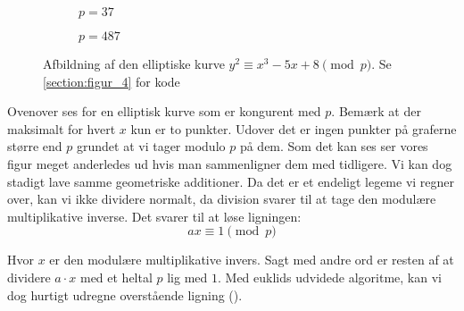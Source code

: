 \begin{figure}[htbp]
\centering
\begin{subfigure}{.5\textwidth}
  \centering
  
  \caption{$p=37$}
  \label{fig:sub1}
\end{subfigure}%
\begin{subfigure}{.5\textwidth}
  \centering
  
  \caption{$p=487$}
  \label{fig:sub2}
\end{subfigure}
\caption{Afbildning af den elliptiske kurve $y^2 \equiv x^3-5x+8 \pmod{p}$. Se \ref{section:figur_4} for kode}
\label{fig:finit_felt}
\end{figure}

Ovenover ses  for en elliptisk kurve som er kongurent med $p$. Bemærk at der maksimalt for hvert $x$ kun er to punkter. Udover det er ingen punkter på graferne større end $p$ grundet at vi tager modulo $p$ på dem. Som det kan ses ser vores figur meget anderledes ud hvis man sammenligner dem med tidligere. Vi kan dog stadigt lave samme geometriske additioner. Da det er et endeligt legeme vi regner over, kan vi ikke dividere normalt, da division svarer til at tage den modulære multiplikative inverse. Det svarer til at løse ligningen:
\begin{equation}\label{eq:division}
ax \equiv 1 \pmod{p}
\end{equation}

Hvor $x$ er den modulære multiplikative invers. Sagt med andre ord er resten af at dividere $a\cdot x$ med et heltal $p$ lig med $1$. Med euklids udvidede algoritme, kan vi dog hurtigt udregne overstående ligning (\cite{donaldknuth1968}).

